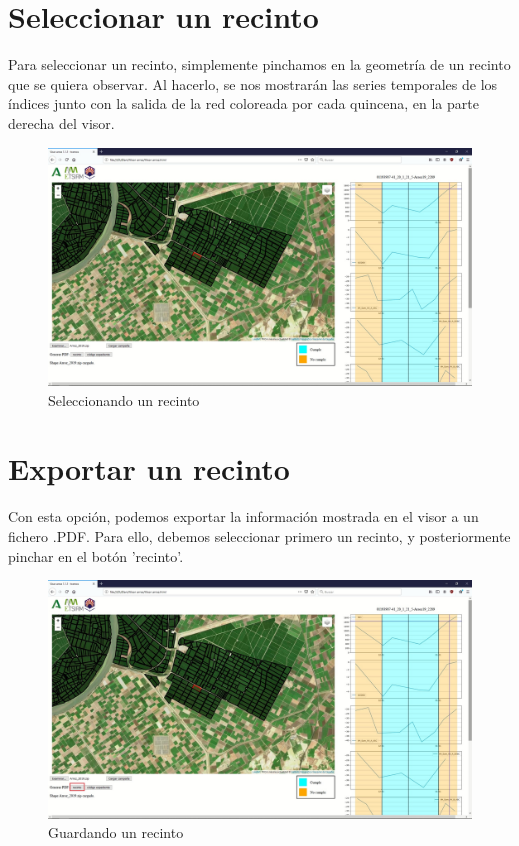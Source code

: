 \documentclass{article}
\begin{document}
\section{Seleccionar un recinto}

Para seleccionar un recinto, simplemente pinchamos en la geometría de un recinto que se quiera observar. Al hacerlo, se nos mostrarán las series temporales de los índices junto con la salida de la red coloreada por cada quincena, en la parte derecha del visor.

\begin{figure}[H]
	\centering
	\includegraphics[width=0.8\linewidth]{recinto.jpg}
	\caption{Seleccionando un recinto}
	\label{fig:recinto}
\end{figure}

\section{Exportar un recinto}

Con esta opción, podemos exportar la información mostrada en el visor a un fichero .PDF. Para ello, debemos seleccionar primero un recinto, y posteriormente pinchar en el botón 'recinto'.

\begin{figure}[H]
	\centering
	\includegraphics[width=0.8\linewidth]{guardar recinto.jpg}
	\caption{Guardando un recinto}
	\label{fig:guardar recinto}
\end{figure}
\end{document}
